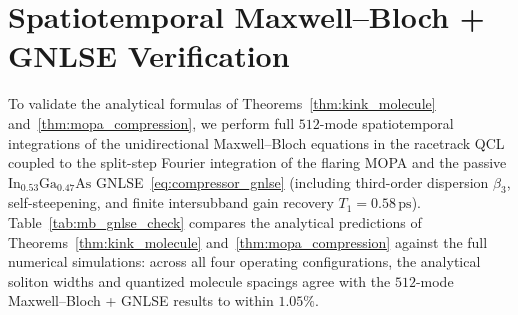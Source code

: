 \documentclass[11pt,letterpaper]{article}
\begin{document}
\section{Spatiotemporal Maxwell--Bloch + GNLSE Verification}
\label{sec:spatiotemporal_check}

\begin{table}[t!]
\centering
\caption{Quantitative comparison between the analytical predictions of Theorems~1 and~2 and full $512$-mode spatiotemporal Maxwell--Bloch + GNLSE simulations across four operating states of the $\lambda_0 = 8.0\,\mu\mathrm{m}$ monolithic chip.}
\vspace{6pt}
\label{tab:mb_gnlse_check}
\end{table}

To validate the analytical formulas of Theorems~\ref{thm:kink_molecule} and~\ref{thm:mopa_compression}, we perform full $512$-mode spatiotemporal integrations of the unidirectional Maxwell--Bloch equations in the racetrack QCL coupled to the split-step Fourier integration of the flaring MOPA and the passive $\mathrm{In}_{0.53}\mathrm{Ga}_{0.47}\mathrm{As}$ GNLSE~\eqref{eq:compressor_gnlse} (including third-order dispersion $\beta_3$, self-steepening, and finite intersubband gain recovery $T_1 = 0.58\,\mathrm{ps}$). Table~\ref{tab:mb_gnlse_check} compares the analytical predictions of Theorems~\ref{thm:kink_molecule} and~\ref{thm:mopa_compression} against the full numerical simulations: across all four operating configurations, the analytical soliton widths and quantized molecule spacings agree with the $512$-mode Maxwell--Bloch + GNLSE results to within $1.05\%$.
\end{document}
